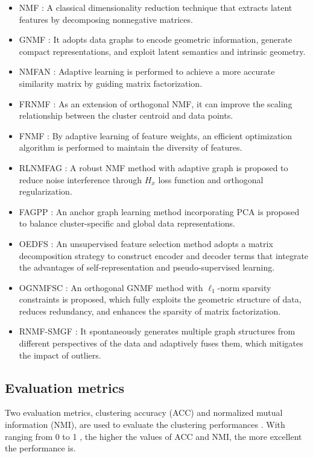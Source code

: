 \documentclass[a4paper,fleqn]{cas-sc}
\begin{document}
\begin{itemize}
	\item  NMF \cite{7}: A classical dimensionality reduction technique that extracts latent features by decomposing nonnegative matrices.
	\item  GNMF \cite{19}: It adopts data graphs to encode geometric information, generate compact representations, and exploit latent semantics and intrinsic geometry.
	\item NMFAN \cite{35}: Adaptive learning is performed to achieve a more accurate similarity matrix by guiding matrix factorization.
	\item FRNMF \cite{49}: As an extension of orthogonal NMF, it can improve the scaling relationship between the cluster centroid and data points.
	\item FNMF \cite{47}: By adaptive learning of feature weights, an efficient optimization algorithm is performed to maintain the diversity of features.
	\item RLNMFAG \cite{16}: A robust NMF method with adaptive graph is proposed to reduce noise interference through $H_x$ loss function and orthogonal regularization.
	\item FAGPP \cite{59}: An anchor graph learning method incorporating PCA is proposed to balance cluster-specific and global data representations.
	\item OEDFS \cite{58}: An unsupervised feature selection method adopts a matrix decomposition strategy to construct encoder and decoder terms that integrate the advantages of self-representation and pseudo-supervised learning.
	\item OGNMFSC \cite{60}: An orthogonal GNMF method with $\ell_{1}$-norm sparsity constraints is proposed, which fully exploits the geometric structure of data, reduces redundancy, and enhances the sparsity of matrix factorization.
	\item RNMF-SMGF \cite{61}: It spontaneously generates multiple graph structures from different perspectives of the data and adaptively fuses them, which mitigates the impact of outliers.
\end{itemize}

\subsection{Evaluation metrics}

Two evaluation metrics, clustering accuracy (ACC) and normalized mutual information (NMI), are used to evaluate the clustering performances \cite{23}. With ranging from 0 to 1 , the higher the values of ACC and NMI, the more excellent the performance is.
\end{document}
